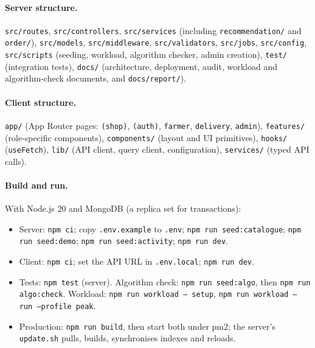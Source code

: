 \documentclass[manuscript,screen,review]{acmart}
\begin{document}
\paragraph{Server structure.} \texttt{src/routes}, \texttt{src/controllers}, \texttt{src/services} (including \texttt{recommendation/} and \texttt{order/}), \texttt{src/models}, \texttt{src/middleware}, \texttt{src/validators}, \texttt{src/jobs}, \texttt{src/config}, \texttt{src/scripts} (seeding, workload, algorithm checker, admin creation), \texttt{test/} (integration tests), \texttt{docs/} (architecture, deployment, audit, workload and algorithm-check documents, and \texttt{docs/report/}).

\paragraph{Client structure.} \texttt{app/} (App Router pages: \texttt{(shop)}, \texttt{(auth)}, \texttt{farmer}, \texttt{delivery}, \texttt{admin}), \texttt{features/} (role-specific components), \texttt{components/} (layout and UI primitives), \texttt{hooks/} (\texttt{useFetch}), \texttt{lib/} (API client, query client, configuration), \texttt{services/} (typed API calls).

\paragraph{Build and run.} With Node.js 20 and MongoDB (a replica set for transactions):
\begin{itemize}
  \item Server: \texttt{npm ci}; copy \texttt{.env.example} to \texttt{.env}; \texttt{npm run seed:catalogue}; \texttt{npm run seed:demo}; \texttt{npm run seed:activity}; \texttt{npm run dev}.
  \item Client: \texttt{npm ci}; set the API URL in \texttt{.env.local}; \texttt{npm run dev}.
  \item Tests: \texttt{npm test} (server). Algorithm check: \texttt{npm run seed:algo}, then \texttt{npm run algo:check}. Workload: \texttt{npm run workload -- setup}, \texttt{npm run workload -- run --profile peak}.
  \item Production: \texttt{npm run build}, then start both under pm2; the server's \texttt{update.sh} pulls, builds, synchronises indexes and reloads.
\end{itemize}
\end{document}
